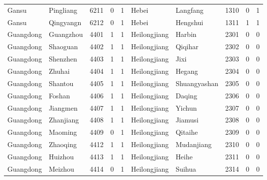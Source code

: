 \documentclass[12pt]{article}
\begin{document}
\begin{table}[!htbp]
\begin{adjustbox}{width=\textwidth, totalheight=\baselineskip,keepaspectratio}
\begin{tabular}{llllllllll}
Gansu     & Pingliang & 6211 & 0   & 1   & Hebei        & Langfang      & 1310 & 0   & 1   \\
Gansu     & Qingyangn & 6212 & 0   & 1   & Hebei        & Hengshui      & 1311 & 1   & 1   \\
Guangdong & Guangzhou & 4401 & 1   & 1   & Heilongjiang & Harbin        & 2301 & 0   & 0   \\
Guangdong & Shaoguan  & 4402 & 1   & 1   & Heilongjiang & Qiqihar       & 2302 & 0   & 0   \\
Guangdong & Shenzhen  & 4403 & 1   & 1   & Heilongjiang & Jixi          & 2303 & 0   & 0   \\
Guangdong & Zhuhai    & 4404 & 1   & 1   & Heilongjiang & Hegang        & 2304 & 0   & 0   \\
Guangdong & Shantou   & 4405 & 1   & 1   & Heilongjiang & Shuangyashan  & 2305 & 0   & 0   \\
Guangdong & Foshan    & 4406 & 1   & 1   & Heilongjiang & Daqing        & 2306 & 0   & 0   \\
Guangdong & Jiangmen  & 4407 & 1   & 1   & Heilongjiang & Yichun        & 2307 & 0   & 0   \\
Guangdong & Zhanjiang & 4408 & 1   & 1   & Heilongjiang & Jiamusi       & 2308 & 0   & 0   \\
Guangdong & Maoming   & 4409 & 0   & 1   & Heilongjiang & Qitaihe       & 2309 & 0   & 0   \\
Guangdong & Zhaoqing  & 4412 & 1   & 1   & Heilongjiang & Mudanjiang    & 2310 & 0   & 0   \\
Guangdong & Huizhou   & 4413 & 1   & 1   & Heilongjiang & Heihe         & 2311 & 0   & 0   \\
Guangdong & Meizhou   & 4414 & 0   & 1   & Heilongjiang & Suihua        & 2314 & 0   & 0  
\end{tabular}
\end{adjustbox}
\end{table}
\end{document}
